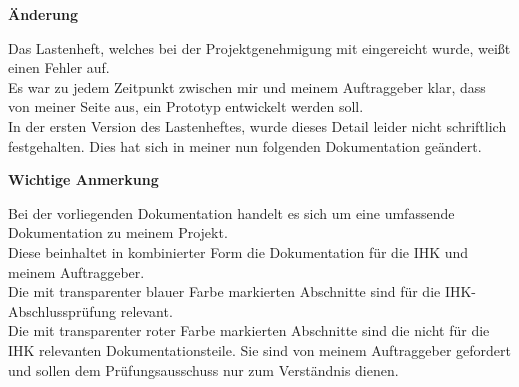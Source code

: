 \vspace{2cm}

\begin{center}
\begin{Huge}
\textbf{Änderung}
\end{Huge}
\end{center}
Das Lastenheft, welches bei der Projektgenehmigung mit eingereicht wurde, weißt einen Fehler auf. 
\\
Es war zu jedem Zeitpunkt zwischen mir und meinem Auftraggeber klar, dass von meiner Seite aus, ein Prototyp entwickelt werden soll.
\\
In der ersten Version des Lastenheftes, wurde dieses Detail leider nicht schriftlich festgehalten. Dies hat sich in meiner nun folgenden Dokumentation geändert. 


\vspace{5cm}

\begin{Huge}
\begin{center}
\textbf{Wichtige Anmerkung}
\end{center}
\end{Huge}
Bei der vorliegenden Dokumentation handelt es sich um eine umfassende Dokumentation zu meinem Projekt. 
\\
Diese beinhaltet in kombinierter Form die Dokumentation für die IHK und meinem Auftraggeber.
\\
Die mit transparenter blauer Farbe markierten Abschnitte sind für die IHK-Abschlussprüfung relevant. 
\\
Die mit transparenter roter Farbe markierten Abschnitte sind die nicht für die IHK relevanten Dokumentationsteile. Sie sind von meinem Auftraggeber gefordert und sollen dem Prüfungsausschuss nur zum Verständnis dienen.



